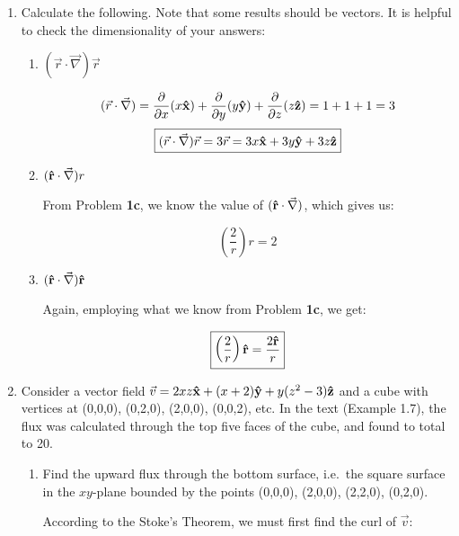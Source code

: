 \begin{enumerate}
\begin{enumerate}
\begin{itemize}
        \end{itemize}

    \end{enumerate}

  \item Calculate the following. Note that some results should be vectors.  It is helpful to check the dimensionality of your answers:

    \begin{enumerate}

      \item $(\vec{r}\cdot\vec{\nabla})\vec{r}$

        $$(\vec{r}\cdot\vec{\nabla})=\frac{\partial}{\partial x}(x\bold{\hat{x}})+\frac{\partial}{\partial y} (y\bold{\hat{y}})+\frac{\partial}{\partial z}(z\bold{\hat{z}})=1+1+1=3$$
        $$\boxed{(\vec{r}\cdot\vec{\nabla})\vec{r}=3\vec{r}=3x\bold{\hat{x}}+3y\bold{\hat{y}}+3z\bold{\hat{z}}}$$

      \item $(\bold{\hat{r}}\cdot\vec{\nabla})r$

        From Problem \textbf{1c}, we know the value of $(\bold{\hat{r}}\cdot\vec{\nabla})$, which gives us:

        $$\boxed{\left( \frac{2}{r} \right)r=2}$$

      \item $(\bold{\hat{r}}\cdot\vec{\nabla})\bold{\hat{r}}$

        Again, employing what we know from Problem \textbf{1c}, we get:

        $$\boxed{\left( \frac{2}{r} \right)\bold{\hat{r}}=\frac{2\bold{\hat{r}}}{r}}$$

    \end{enumerate}

  \item Consider a vector field $\vec{v}=2xz\bold{\hat{x}}+(x+2)\bold{\hat{y}}+y(z^2-3)\bold{\hat{z}}$ and a cube with vertices at (0,0,0), (0,2,0), (2,0,0), (0,0,2), etc. In the text (Example 1.7), the flux was calculated through the top five faces of the cube, and found to total to 20.

    \begin{enumerate}

      \item Find the upward flux through the bottom surface, i.e.\ the square surface in the $xy$-plane bounded by the points (0,0,0), (2,0,0), (2,2,0), (0,2,0).

        According to the Stoke's Theorem, we must first find the curl of $\vec{v}$:


\end{enumerate}
\end{enumerate}

